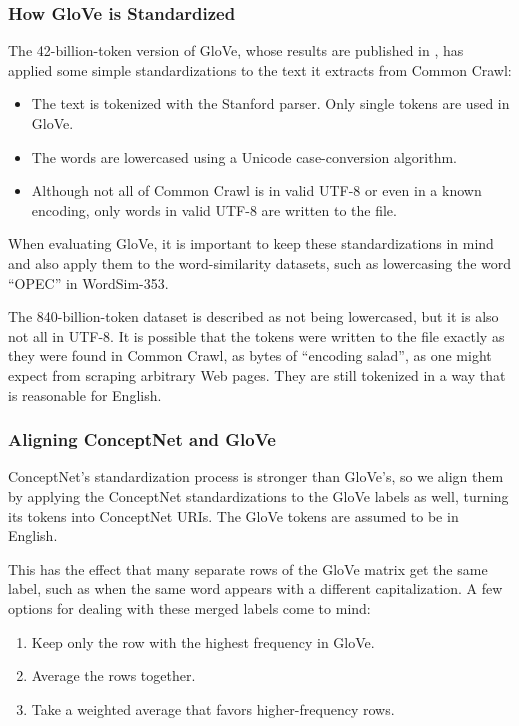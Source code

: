 \documentclass[letterpaper]{article}
\begin{document}
\subsubsection{How GloVe is Standardized}

The 42-billion-token version of GloVe, whose results are published in
\cite{pennington2014glove}, has applied some simple standardizations
to the text it extracts from Common Crawl:

\begin{itemize}
\item The text is tokenized with the Stanford parser. Only single tokens are
    used in GloVe.
\item The words are lowercased using a Unicode case-conversion
    algorithm.
\item Although not all of Common Crawl is in valid UTF-8 or even in a known
    encoding, only words in valid UTF-8 are written to the file.
\end{itemize}

When evaluating GloVe, it is important to keep these standardizations in mind
and also apply them to the word-similarity datasets, such as lowercasing the
word ``OPEC'' in WordSim-353.

The 840-billion-token dataset is described as not being lowercased, but it is
also not all in UTF-8. It is possible that the tokens were written to the file
exactly as they were found in Common Crawl, as bytes of ``encoding salad'', as
one might expect from scraping arbitrary Web pages. They are still tokenized in
a way that is reasonable for English.

\subsubsection{Aligning ConceptNet and GloVe}

ConceptNet's standardization process is stronger than GloVe's, so we align them
by applying the ConceptNet standardizations to the GloVe labels as well, turning
its tokens into ConceptNet URIs. The GloVe tokens are assumed to be in English.

This has the effect that many separate rows of the GloVe matrix get the same
label, such as when the same word appears with a different capitalization. A
few options for dealing with these merged labels come to mind:

\begin{enumerate}
\item Keep only the row with the highest frequency in GloVe.
\item Average the rows together.
\item Take a weighted average that favors higher-frequency rows.
\end{enumerate}
\end{document}
